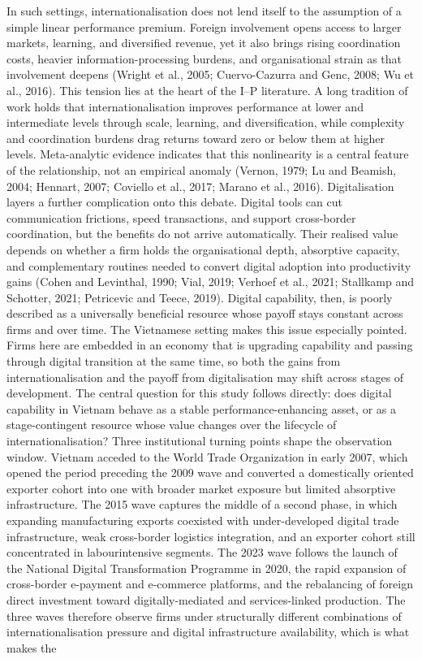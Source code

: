 \documentclass[12pt,a4paper]{article}
\begin{document}
In such settings, internationalisation does not lend itself to the
assumption of a simple linear performance premium. Foreign involvement
opens access to larger markets, learning, and diversified revenue, yet
it also brings rising coordination costs, heavier information-processing
burdens, and organisational strain as that involvement deepens (Wright
et al., 2005; Cuervo-Cazurra and Genc, 2008; Wu et al., 2016). This
tension lies at the heart of the I--P literature. A long tradition of
work holds that internationalisation improves performance at lower and
intermediate levels through scale, learning, and diversification, while
complexity and coordination burdens drag returns toward zero or below
them at higher levels. Meta-analytic evidence indicates that this
nonlinearity is a central feature of the relationship, not an empirical
anomaly (Vernon, 1979; Lu and Beamish, 2004; Hennart, 2007; Coviello et
al., 2017; Marano et al., 2016). Digitalisation layers a further
complication onto this debate. Digital tools can cut communication
frictions, speed transactions, and support cross-border coordination,
but the benefits do not arrive automatically. Their realised value
depends on whether a firm holds the organisational depth, absorptive
capacity, and complementary routines needed to convert digital adoption
into productivity gains (Cohen and Levinthal, 1990; Vial, 2019; Verhoef
et al., 2021; Stallkamp and Schotter, 2021; Petricevic and Teece, 2019).
Digital capability, then, is poorly described as a universally
beneficial resource whose payoff stays constant across firms and over
time. The Vietnamese setting makes this issue especially pointed. Firms
here are embedded in an economy that is upgrading capability and passing
through digital transition at the same time, so both the gains from
internationalisation and the payoff from digitalisation may shift across
stages of development. The central question for this study follows
directly: does digital capability in Vietnam behave as a stable
performance-enhancing asset, or as a stage-contingent resource whose
value changes over the lifecycle of internationalisation? Three
institutional turning points shape the observation window. Vietnam
acceded to the World Trade Organization in early 2007, which opened the
period preceding the 2009 wave and converted a domestically oriented
exporter cohort into one with broader market exposure but limited
absorptive infrastructure. The 2015 wave captures the middle of a second
phase, in which expanding manufacturing exports coexisted with
under-developed digital trade infrastructure, weak cross-border
logistics integration, and an exporter cohort still concentrated in
labourintensive segments. The 2023 wave follows the launch of the
National Digital Transformation Programme in 2020, the rapid expansion
of cross-border e-payment and e-commerce platforms, and the rebalancing
of foreign direct investment toward digitally-mediated and
services-linked production. The three waves therefore observe firms
under structurally different combinations of internationalisation
pressure and digital infrastructure availability, which is what makes
the
\end{document}
